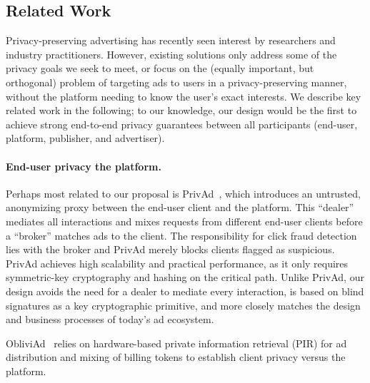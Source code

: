 %
%
%


\subsection{Related Work}
\label{s:bg-related}
%
Privacy-preserving advertising has recently seen interest by researchers and industry practitioners.
%
However, existing solutions only address some of the privacy goals we seek to meet, or focus on the (equally important, but orthogonal) problem of targeting ads to users in a privacy-preserving manner, \ie without the platform needing to know the user's exact interests.
%
We describe key related work in the following; to our knowledge, our design would be the first to achieve strong end-to-end privacy guarantees between all participants (end-user, platform, publisher, and advertiser).
%

\paragraph{End-user privacy \vs the platform.}
%
Perhaps most related to our proposal is PrivAd~\cite{privad}, which introduces
an untrusted, anonymizing proxy between the end-user client and the platform.
%
This ``dealer'' mediates all interactions and mixes requests from different
end-user clients before a ``broker'' matches ads to the client.
%
The responsibility for click fraud detection lies with the broker and PrivAd
merely blocks clients flagged as suspicious.
%
PrivAd achieves high scalability and practical performance, as it only requires
symmetric-key cryptography and hashing on the critical path.
%
Unlike PrivAd, our design avoids the need for a dealer to mediate every
interaction, is based on blind signatures as a key cryptographic primitive,
and more closely matches the design and business processes of today's
ad ecosystem.
%

%
ObliviAd~\cite{obliviad} relies on hardware-based private information retrieval
(PIR) for ad distribution and mixing of billing tokens to establish client
privacy versus the platform.
%
%

